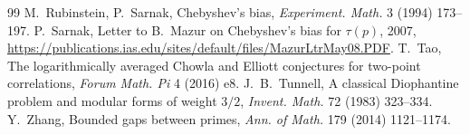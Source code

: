 \documentclass[11pt]{article}
\theoremstyle{definition}\newtheorem{definition}[theorem]{Definition}
\theoremstyle{remark}\newtheorem{remark}[theorem]{Remark}
\begin{document}
\begin{thebibliography}{99}
 M.~Rubinstein, P.~Sarnak, Chebyshev's bias, \emph{Experiment. Math.} 3 (1994) 173--197.
 P.~Sarnak, Letter to B.~Mazur on Chebyshev's bias for $\tau(p)$, 2007, \url{https://publications.ias.edu/sites/default/files/MazurLtrMay08.PDF}.
 T.~Tao, The logarithmically averaged Chowla and Elliott conjectures for two-point correlations, \emph{Forum Math. Pi} 4 (2016) e8.
 J.~B.~Tunnell, A classical Diophantine problem and modular forms of weight $3/2$, \emph{Invent. Math.} 72 (1983) 323--334.
 Y.~Zhang, Bounded gaps between primes, \emph{Ann. of Math.} 179 (2014) 1121--1174.
\end{thebibliography}
\end{document}
